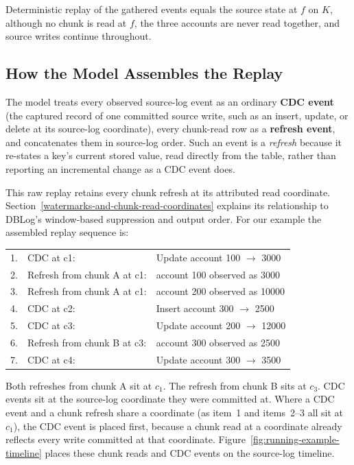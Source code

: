 \documentclass[letterpaper,10pt,twocolumn]{article}
\begin{document}
Deterministic replay of the gathered events equals the source state at
$f$ on $K$, although no chunk is read at $f$, the three accounts are
never read together, and source writes continue throughout.

\subsection{How the Model Assembles the
Replay}\label{how-dblog-assembles-the-replay}

The model treats every observed source-log event as an ordinary
\textbf{CDC event} (the captured record of one committed source
write, such as an insert, update, or delete at its source-log coordinate),
every chunk-read row as a \textbf{refresh event}, and concatenates them
in source-log order. Such an event is a \emph{refresh} because it
re-states a key's current stored value, read directly from the table,
rather than reporting an incremental change as a CDC event does.

This raw replay retains every chunk refresh at its attributed read
coordinate. Section~\ref{watermarks-and-chunk-read-coordinates} explains
its relationship to DBLog's window-based suppression and output order.
For our example the assembled replay sequence is:

\begin{center}\ttfamily\scriptsize
\begin{tabular}{@{}r@{\hskip 0.4em}l@{\hskip 1em}l@{}}
1. & CDC at c1:                  & Update account 100 $\to$ 3000\\
2. & Refresh from chunk A at c1: & account 100 observed as 3000\\
3. & Refresh from chunk A at c1: & account 200 observed as 10000\\
4. & CDC at c2:                  & Insert account 300 $\to$ 2500\\
5. & CDC at c3:                  & Update account 200 $\to$ 12000\\
6. & Refresh from chunk B at c3: & account 300 observed as 2500\\
7. & CDC at c4:                  & Update account 300 $\to$ 3500\\
\end{tabular}
\end{center}

Both refreshes from chunk A sit at $c_1$. The refresh from
chunk B sits at $c_3$. CDC events sit at the source-log
coordinate they were committed at. Where a CDC event and a chunk
refresh share a coordinate (as item~1 and items~2--3 all sit at
$c_1$), the CDC event is placed first, because a chunk read at a
coordinate already reflects every write committed at that coordinate.
Figure~\ref{fig:running-example-timeline}
places these chunk reads and CDC events on the source-log timeline.
\end{document}
